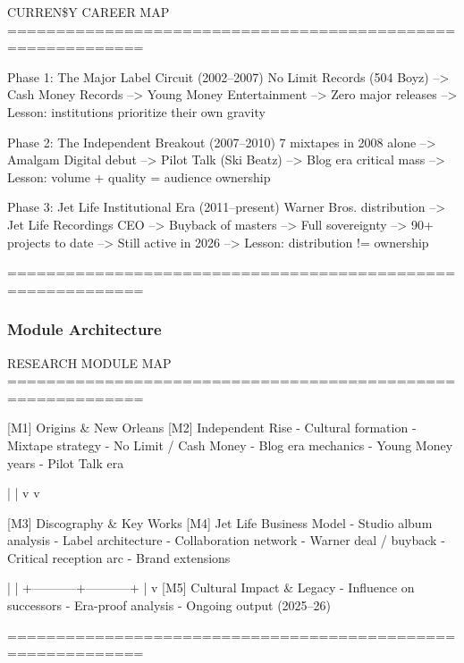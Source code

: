 \documentclass[11pt,letterpaper]{article}
\begin{document}
\begin{center}
\begin{asciibox}
CURREN\$Y CAREER MAP
============================================================

Phase 1: The Major Label Circuit (2002--2007)
  No Limit Records (504 Boyz) --> Cash Money Records
  --> Young Money Entertainment --> Zero major releases
  --> Lesson: institutions prioritize their own gravity

Phase 2: The Independent Breakout (2007--2010)
  7 mixtapes in 2008 alone --> Amalgam Digital debut
  --> Pilot Talk (Ski Beatz) --> Blog era critical mass
  --> Lesson: volume + quality = audience ownership

Phase 3: Jet Life Institutional Era (2011--present)
  Warner Bros. distribution --> Jet Life Recordings CEO
  --> Buyback of masters --> Full sovereignty
  --> 90+ projects to date --> Still active in 2026
  --> Lesson: distribution != ownership

============================================================
\end{asciibox}
\end{center}

\subsubsection{Module Architecture}

\begin{center}
\begin{asciibox}
RESEARCH MODULE MAP
============================================================

[M1] Origins \& New Orleans         [M2] Independent Rise
  - Cultural formation                 - Mixtape strategy
  - No Limit / Cash Money              - Blog era mechanics
  - Young Money years                  - Pilot Talk era

           |                                  |
           v                                  v

[M3] Discography \& Key Works       [M4] Jet Life Business Model
  - Studio album analysis              - Label architecture
  - Collaboration network              - Warner deal / buyback
  - Critical reception arc             - Brand extensions

           |                                  |
           +-----------+-----------+
                       |
                       v
           [M5] Cultural Impact \& Legacy
              - Influence on successors
              - Era-proof analysis
              - Ongoing output (2025--26)

============================================================
\end{asciibox}
\end{center}
\end{document}
